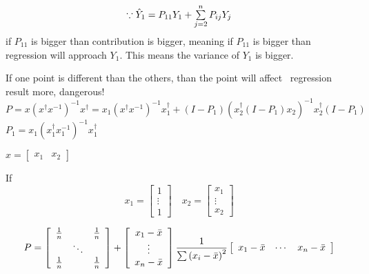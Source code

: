 \documentclass{article}
\begin{document}
\bigskip

\begin{equation*}
\because \hat{Y}_{1}=P_{11}Y_{1}+\mathop{\textstyle \sum }\limits_{j=2}^{n}P_{ij}Y_{j}
\end{equation*}%
if $P_{11}$ is bigger than contribution is bigger, meaning if $P_{11}$ is
bigger than regression will approach $Y_{1}$. This means the variance of $%
Y_{1}$ is bigger.

If one point is different than the others, than the point will affect \
regression result more, dangerous!%
\begin{equation*}
P=x\left( x^{\dagger }x^{-1}\right) ^{-1}x^{\dagger }=x_{1}\left( x^{\dagger
}x^{-1}\right) ^{-1}x_{1}^{\dagger }+\left( I-P_{1}\right) \left(
x_{2}^{\dagger }\left( I-P_{1}\right) x_{2}\right) ^{-1}x_{2}^{\dagger
}\left( I-P_{1}\right)
\end{equation*}%
$P_{1}=x_{1}\left( x_{1}^{\dagger }x_{1}^{-1}\right) ^{-1}x_{1}^{\dagger }$

\bigskip

$x=\left[ 
\begin{array}{cc}
x_{1} & x_{2}%
\end{array}%
\right] $

If%
\begin{equation*}
x_{1}=\left[ 
\begin{array}{c}
1 \\ 
\vdots \\ 
1%
\end{array}%
\right] \quad x_{2}=\left[ 
\begin{array}{c}
x_{1} \\ 
\vdots \\ 
x_{2}%
\end{array}%
\right]
\end{equation*}

\begin{equation*}
P=\left[ 
\begin{array}{ccc}
\frac{1}{n} &  & \frac{1}{n} \\ 
& \ddots &  \\ 
\frac{1}{n} &  & \frac{1}{n}%
\end{array}%
\right] +\left[ 
\begin{array}{c}
x_{1}-\bar{x} \\ 
\vdots \\ 
x_{n}-\bar{x}%
\end{array}%
\right] \frac{1}{\tsum \left( x_{i}-\bar{x}\right) ^{2}}\left[ 
\begin{array}{ccc}
x_{1}-\bar{x} & \cdots & x_{n}-\bar{x}%
\end{array}%
\right]
\end{equation*}
\end{document}
